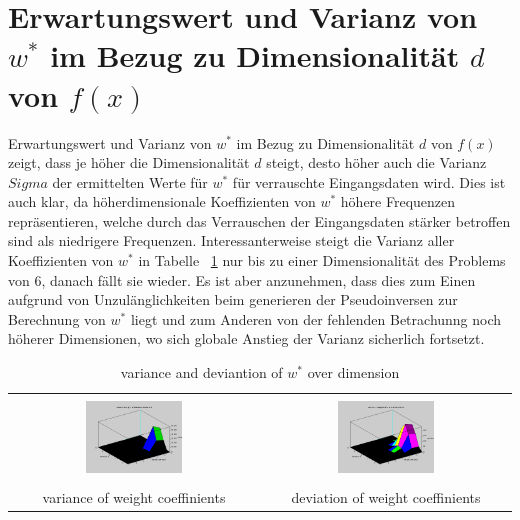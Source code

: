 \documentclass[]{report}
\begin{document}
\section{Erwartungswert und Varianz von $w^*$ im Bezug zu Dimensionalität $d$ von $f(x)$}

Erwartungswert und Varianz von $w^*$ im Bezug zu Dimensionalität $d$ von $f(x)$ zeigt, dass je h\"oher die Dimensionalität $d$ steigt, desto h\"oher auch die Varianz $Sigma$ der ermittelten Werte f\"ur $w^*$ f\"ur verrauschte Eingangsdaten wird. Dies ist auch klar, da höherdimensionale Koeffizienten von $w^*$ h\"ohere Frequenzen repr\"asentieren, welche durch das Verrauschen der Eingangsdaten st\"arker betroffen sind als niedrigere Frequenzen.
Interessanterweise steigt die Varianz aller Koeffizienten von $w^*$ in Tabelle ~\ref{tab:VarianceAndDeviantion} nur bis zu einer Dimensionalit\"at des Problems von 6, danach f\"allt sie wieder. Es ist aber anzunehmen, dass dies zum Einen aufgrund von Unzul\"anglichkeiten beim generieren der Pseudoinversen zur Berechnung von $w^*$ liegt und zum Anderen von der fehlenden Betrachunng noch h\"oherer Dimensionen, wo sich globale Anstieg der Varianz sicherlich fortsetzt.

\begin{table}[h]
\begin{tabular}{| c | c |}
\hline
 & \\
\includegraphics[width=0.4\textwidth]{./images/VarianceWeightCoeffinientsOverDimension.png} & \includegraphics[width=0.4\textwidth]{./images/DeviationWeightCoeffinientsOverDimension.png} \\
 & \\
variance of weight coeffinients & deviation of weight coeffinients \\
\hline
\end{tabular}
\caption{variance and deviantion of $w^*$ over dimension}
\label{tab:VarianceAndDeviantion}
\end{table}
\end{document}
